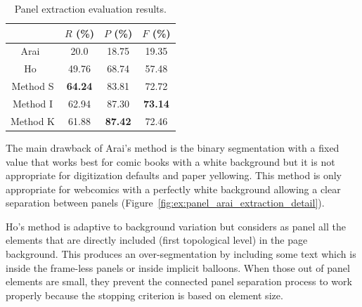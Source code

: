   \begin{table}[ht]
    \normalsize

    \centering
    \caption[Panel extraction evaluation results]{Panel extraction evaluation results.}
    \begin{tabular}{|c|c|c|c|}
          \hline
          &  $R$ (\%)  & $P$ (\%)  & $F$ (\%)     \\
          \hline
          Arai~\cite{Arai11}   & 20.0       & 18.75    & 19.35    \\
          \hline
          Ho~\cite{Ho2012}   & 49.76       & 68.74    & 57.48    \\
          \hline
          Method S          & \textbf{64.24}       & 83.81   & 72.72     \\
          \hline
          Method I          & 62.94       & 87.30   & \bf{73.14}      \\
          \hline
          Method K          & 61.88       & \textbf{87.42}     & 72.46      \\
          \hline
        \end{tabular}
    \label{tab:panel_extraction_comparision_results}
  \end{table}%


The main drawback of Arai's method is the binary segmentation with a fixed value that works best for comic books with a white background but it is not appropriate for digitization defaults and paper yellowing.
This method is only appropriate for webcomics with a perfectly white background allowing a clear separation between panels (Figure~\ref{fig:ex:panel_arai_extraction_detail}).

Ho's method is adaptive to background variation but considers as panel all the elements that are directly included (first topological level) in the page background.
This produces an over-segmentation by including some text which is inside the frame-less panels or inside implicit balloons.
When those out of panel elements are small, they prevent the connected panel separation process to work properly because the stopping criterion is based on element size.

